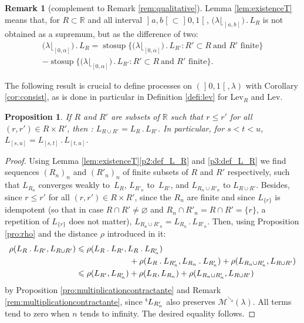 \documentclass[JEP,XML,SOM,Unicode,NoEqCountersInSection,NoFloatCountersInSection,published]{cedram}
\newcommand{\ldot}{\mathbin{.}}
\theoremstyle{plain}
\newtheorem{pro}[them]{Proposition}
\theoremstyle{definition}
\newtheorem{rem}[them]{Remark}
\newcommand{\lev}{\mathrm{Lev}}
\newcommand{\trans}{{}^{\mathrm{t}}\mkern-1mu}
\newcommand{\la}{\lambda}
\newcommand{\R}{\mathbb{R}}
\newcommand{\stosup}{\operatorname{stosup}}
\newcommand{\mdec}{\mathcal{M}^{\scriptscriptstyle\searrow}}
\newcommand{\op}{\mathopen}
\newcommand{\clo}{\mathclose}
\begin{document}
\begin{rem}[complement to Remark \ref{rem:qualitative}]\label{rem:difference} Lemma \ref{lem:existenceT} means that, for $R\subset \R$ and all interval $\op]a,b\clo[\subset\op]0,1\clo[$, $\bigl(\la\lfloor_{\op]a,b\clo[}\bigr)\ldot L_{R}$ is not obtained as a supremum, but as the difference of two:
\begin{multline*}
\bigl(\la\lfloor_{[0,\alpha]}\bigr)\ldot L_{R}=\stosup\bigl\{\bigl(\la\lfloor_{[0,\alpha]}\bigr)\ldot L_{R'}:R'\subset R\ \text{and $R'$ finite}\bigr\}\\
- \stosup\bigl\{\bigl(\la\lfloor_{[0,\alpha]}\bigr)\ldot L_{R'}:R'\subset R\ \text{and $R'$ finite}\bigr\}.
\end{multline*}
\end{rem}

The following result is crucial to define processes on $(\op]0,1\clo[,\la)$ with Corollary \ref{cor:consist}, as is done in particular in Definition \ref{defi:lev} for $\lev_R$ and $\lev$.
\begin{pro}\label{pro:compo}If $R$ and $R'$ are subsets of $\R$ such that $r\leqslant r'$ for all $(r,r')\in R\times R'$, then
: $L_{R\cup R'}=L_{R}{}\ldot L_{R'}$.
In particular, for $s<t<u$, $L_{[s,u]}=L_{[s,t]}{}\ldot L_{[t,u]}$.
\end{pro}
\begin{proof} Using Lemma \ref{lem:existenceT}\eqref{p2:def_L_R} and \eqref{p3:def_L_R} we find sequences $(R_n)_n$ and $(R'_n)_n$ of finite subsets of $R$ and $R'$ respectively, such that $L_{R_n}$ converges weakly to~$L_R$, $L_{R'_n}$ to~$L_{R'}$, and $L_{R_n\cup R'_n}$ to $L_{R\cup R'}$. Besides, since $r\leqslant r'$ for all $(r,r')\in R\times R'$, since the $R_n$ are finite and since $L_{\{r\}}$ is idempotent (so that in case $R\cap R'\neq\varnothing$ and $R_n\cap R'_n=R\cap R'=\{r\}$, a repetition of $L_{\{r\}}$ does not matter), $L_{R_n\cup R'_n}=L_{R_n}{}\ldot L_{R'_n}$. Then, using Proposition \ref{pro:rho} and the distance $\rho$ introduced in it:
\begin{align*}
\rho(L_R\ldot L_{R'},L_{R\cup R'})&\leqslant\rho(L_R\ldot L_{R'},L_R\ldot L_{R'_n})\\
&\hspace*{2.3cm}+\rho(L_R\ldot L_{R'_n},L_{R_n}{}\ldot L_{R'_n})+\rho(L_{R_n\cup R'_n},L_{R\cup R'})\\
&\leqslant\rho(L_{R'},L_{R'_n})+\rho(L_R,L_{R_n})+\rho(L_{R_n\cup R'_n},L_{R\cup R'})
\end{align*}
by Proposition \ref{pro:multiplicationcontractante} and Remark \ref{rem:multiplicationcontractante}, since $\trans{L_{R'_n}}$ also preserves $\mdec(\la)$. All terms tend to zero when $n$ tends to infinity. The desired equality follows.
\end{proof}
\end{document}
